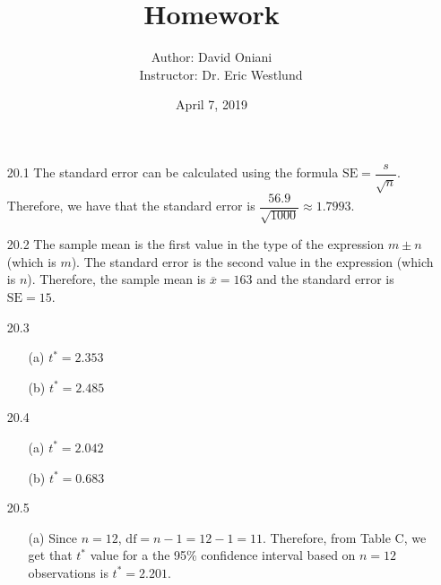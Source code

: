 \documentclass[11pt, a4paper]{article}
\title{\bf{Homework \textnumero 14}}
\author{Author: David Oniani
\\
\ \ \ Instructor: Dr. Eric Westlund}
\date{April 7, 2019}
\begin{document}
\maketitle
\begin{itemize}
\item[20.1]
The standard error can be calculated using the formula
$\text{SE} = \dfrac{s}{\sqrt{n}}$. Therefore, we have
that the standard error is $\dfrac{56.9}{\sqrt{1000}} \approx 1.7993$.

\item[]
\item[]

\item[20.2]
The sample mean is the first value in the type
of the expression $m \pm n$ (which is $m$).
The standard error is the second value in the
expression (which is $n$). Therefore, the sample
mean is $\overline{x} = 163$ and the standard
error is $\text{SE} = 15$.

\item[]
\item[]

\item[20.3]
\begin{itemize}
\item[(a)]
$t^* = 2.353$

\item[]

\item[(b)]
$t^* = 2.485$
\end{itemize}

\item[]
\item[]

\item[20.4]
\begin{itemize}
\item[(a)]
$t^* = 2.042$

\item[]

\item[(b)]
$t^* = 0.683$
\end{itemize}

\item[]
\item[]

\item[20.5]
\begin{itemize}
\item[(a)]
Since $n = 12$, $\text{df} = n - 1 = 12 - 1 = 11$.
Therefore, from Table C, we get that $t^*$ value for
a the 95\% confidence interval based on $n = 12$ observations
is $t^* = 2.201$.
    

\end{itemize}
\end{itemize}
\end{document}

